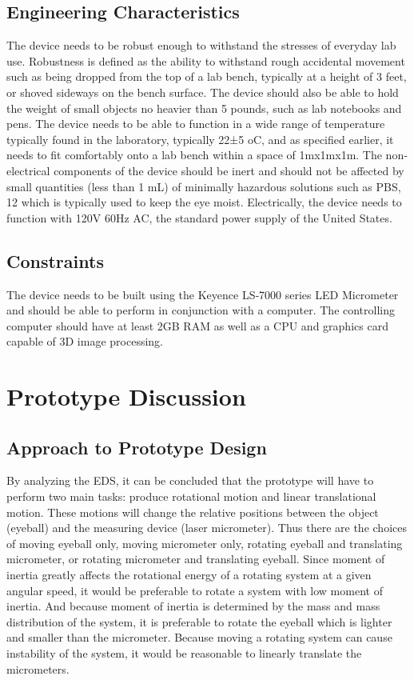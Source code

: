 \documentclass{article}
\begin{document}
\subsection{Engineering Characteristics}
The device needs to be robust enough to withstand the stresses of everyday lab use. Robustness is defined as the ability to withstand rough accidental movement such as being dropped from the top of a lab bench, typically at a height of 3 feet, or shoved sideways on the bench surface. The device should also be able to hold the weight of small objects no heavier than 5 pounds, such as lab notebooks and pens. The device needs to be able to function in a wide range of temperature typically found in the laboratory, typically 22±5 oC, and as specified earlier, it needs to fit comfortably onto a lab bench within a space of 1mx1mx1m. The non‐electrical components of the device should be inert and should not be affected by small quantities (less than 1 mL) of minimally hazardous solutions such as PBS, 12 which is typically used to keep the eye moist. Electrically, the device needs to function with 120V 60Hz AC, the standard power supply of the United States.

\subsection{Constraints}
The device needs to be built using the Keyence LS‐7000 series LED Micrometer and should be able to perform in conjunction with a computer. The controlling computer should have at least 2GB RAM as well as a CPU and graphics card capable of 3D image processing.


\section{Prototype Discussion}
\subsection{Approach to Prototype Design}
By analyzing the EDS, it can be concluded that the prototype will have to perform two main tasks: produce rotational motion and linear translational motion. These motions will change the relative positions between the object (eyeball) and the measuring device (laser micrometer). Thus there are the choices of moving eyeball only, moving micrometer only, rotating eyeball and translating micrometer, or rotating micrometer and translating eyeball. Since moment of inertia greatly affects the rotational energy of a rotating system at a given angular speed, it would be preferable to rotate a system with low moment of inertia. And because moment of inertia is determined by the mass and mass distribution of the system, it is preferable to rotate the eyeball which is lighter and smaller than the micrometer. Because moving a rotating system can cause instability of the system, it would be reasonable to linearly translate the micrometers. 
\end{document}
